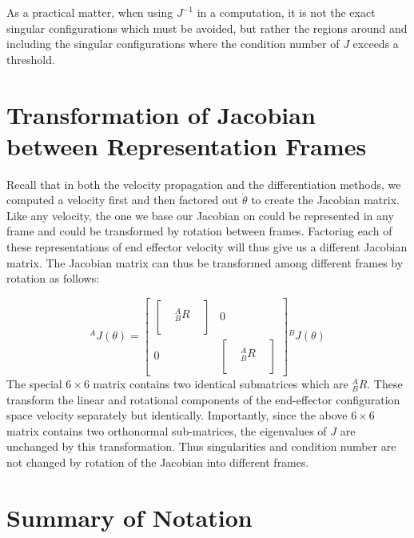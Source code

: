 As a practical matter, when using $J^{-1}$ in a computation, it is not the exact singular configurations which must be avoided, but rather the regions around and including the singular configurations where the condition number of $J$ exceeds a threshold.


\section{Transformation of Jacobian between Representation Frames}\label{JacobianTransform}

Recall that in both the velocity propagation and the differentiation methods, we computed a velocity first and then factored out $\dot{\theta}$ to create the Jacobian matrix.   Like any velocity, the one we base our Jacobian on could be represented in any frame and could be transformed by rotation between frames.  Factoring each of these representations of end effector velocity will thus give us a different Jacobian matrix.   The Jacobian matrix can thus be transformed among different frames by rotation as follows:

\[
^AJ(\theta) =
\begin{bmatrix}
 \begin{bmatrix}
     & & \\
     & {^A_BR} & \\
     & & \\
 \end{bmatrix}
&
 0  \\
 0 &
 \begin{bmatrix}
     & & \\
     & {^A_BR} & \\
     & & \\
 \end{bmatrix}
\end{bmatrix}
{^BJ(\theta)}
\]
The special $6\times6$ matrix contains two identical submatrices which are ${^A_BR}$.  These transform the linear and rotational components of the end-effector configuration space velocity separately but identically.  Importantly, since the above $6\times6$ matrix contains two orthonormal sub-matrices, the eigenvalues of $J$ are unchanged by this transformation.  Thus singularities and condition number are not changed by rotation of the Jacobian into different frames.




\section{Summary of Notation}



